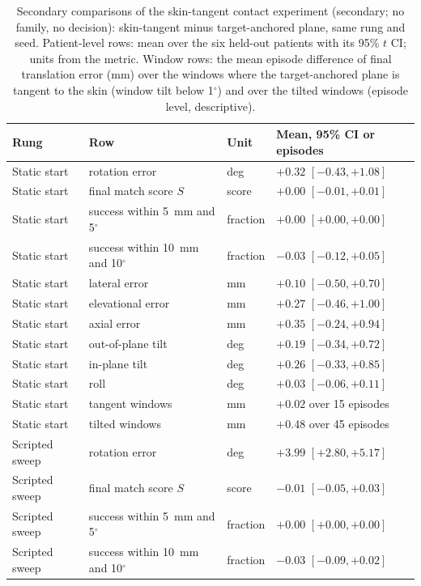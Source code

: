 
\begin{table}[tp]
\renewcommand{\baselinestretch}{1}\scriptsize
\caption{Secondary comparisons of the skin-tangent contact experiment (secondary; no family, no decision): skin-tangent minus target-anchored plane, same rung and seed. Patient-level rows: mean over the six held-out patients with its 95\% $t$ CI; units from the metric. Window rows: the mean episode difference of final translation error (mm) over the windows where the target-anchored plane is tangent to the skin (window tilt below 1$^\circ$) and over the tilted windows (episode level, descriptive).}
\label{tab:s11-arm-b-secondary}
\centering
\setlength{\tabcolsep}{3pt}
\begin{tabularx}{\textwidth}{@{}l >{\raggedright\arraybackslash}X l l@{}}
\toprule
Rung & Row & Unit & Mean, 95\% CI or episodes \\
\midrule
Static start & rotation error & deg & $+0.32$ $[-0.43, +1.08]$ \\
Static start & final match score $S$ & score & $+0.00$ $[-0.01, +0.01]$ \\
Static start & success within 5~mm and 5$^\circ$ & fraction & $+0.00$ $[+0.00, +0.00]$ \\
Static start & success within 10~mm and 10$^\circ$ & fraction & $-0.03$ $[-0.12, +0.05]$ \\
Static start & lateral error & mm & $+0.10$ $[-0.50, +0.70]$ \\
Static start & elevational error & mm & $+0.27$ $[-0.46, +1.00]$ \\
Static start & axial error & mm & $+0.35$ $[-0.24, +0.94]$ \\
Static start & out-of-plane tilt & deg & $+0.19$ $[-0.34, +0.72]$ \\
Static start & in-plane tilt & deg & $+0.26$ $[-0.33, +0.85]$ \\
Static start & roll & deg & $+0.03$ $[-0.06, +0.11]$ \\
Static start & tangent windows & mm & $+0.02$ over 15 episodes \\
Static start & tilted windows & mm & $+0.48$ over 45 episodes \\
Scripted sweep & rotation error & deg & $+3.99$ $[+2.80, +5.17]$ \\
Scripted sweep & final match score $S$ & score & $-0.01$ $[-0.05, +0.03]$ \\
Scripted sweep & success within 5~mm and 5$^\circ$ & fraction & $+0.00$ $[+0.00, +0.00]$ \\
Scripted sweep & success within 10~mm and 10$^\circ$ & fraction & $-0.03$ $[-0.09, +0.02]$ \\

\end{tabularx}
\end{table}
